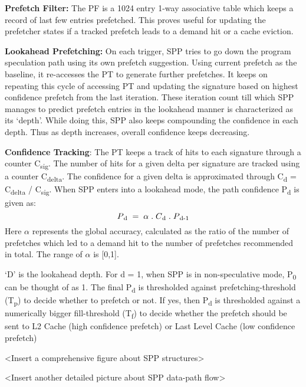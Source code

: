 \textbf{Prefetch Filter:} The PF is a 1024 entry 1-way associative table 
which keeps a record of
last few entries prefetched.  This proves useful for updating the prefetcher 
states if a tracked prefetch leads to a demand hit or a cache eviction. 

\textbf{Lookahead Prefetching:} On each trigger, SPP tries to go down
the program speculation path using its own prefetch suggestion.
Using current prefetch as the baseline, it re-accesses the PT to generate further
prefetches.  It keeps on repeating this cycle of accessing PT and
updating the signature based on highest confidence prefetch from the
last iteration.  These iteration count till which SPP manages to
predict prefetch entries in the lookahead manner is characterized as
its `depth'.  While doing this, SPP also keeps compounding the
confidence in each depth.  Thus as depth increases, overall confidence
keeps decreasing.  

\textbf{Confidence Tracking}: The PT keeps a track of hits to each
signature through a counter C\textsubscript{sig}.  The number of hits
for a given delta per signature are tracked using a counter
C\textsubscript{delta}.  The confidence for a given delta is
approximated through C\textsubscript{d} = C\textsubscript{delta} /
C\textsubscript{sig}.  When SPP enters into a lookahead mode, the path
confidence P\textsubscript{d} is given as:
$$P\textsubscript{d} \;=\; \alpha  \;.\;  C\textsubscript{d}  \;.\;  P\textsubscript{d-1}$$ 
Here $\alpha$ represents the global accuracy, calculated as the ratio of 
the number of prefetches which led to a demand hit to the number of 
prefetches recommended in total. The range of $\alpha$ is [0,1].

`D' is the lookahead depth.  For d = 1, when SPP is in
non-speculative mode, P\textsubscript{0} can be thought of as 1. 
The final P\textsubscript{d} is thresholded against prefetching-threshold
(T\textsubscript{p}) to decide whether to prefetch or not.  If yes,
then P\textsubscript{d} is thresholded against a numerically bigger
fill-threshold (T\textsubscript{f}) to decide whether the prefetch
should be sent to L2 Cache (high confidence prefetch) or Last Level
Cache (low confidence prefetch)

<Insert a comprehensive figure about SPP structures>

<Insert another detailed picture about SPP data-path flow>

